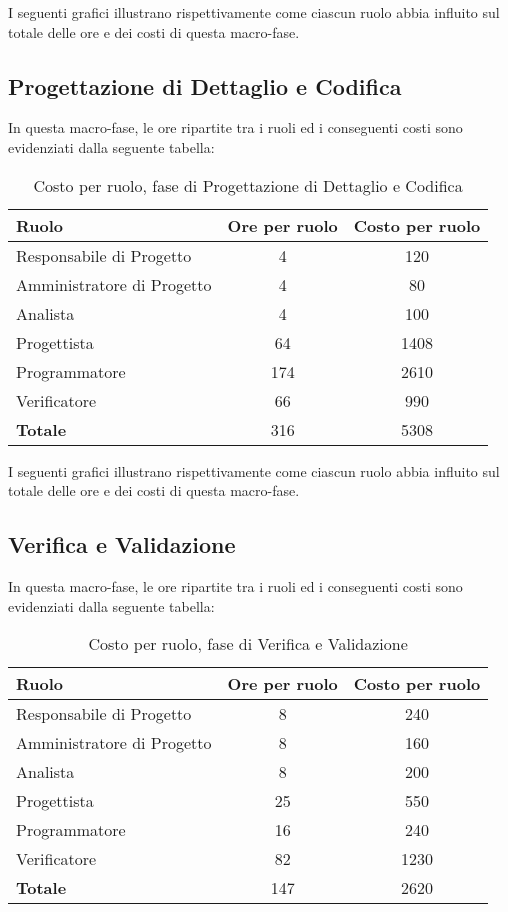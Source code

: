 I seguenti grafici illustrano rispettivamente come ciascun ruolo abbia influito sul totale delle ore e dei costi di questa macro-fase.

\subsection{Progettazione di Dettaglio e Codifica}
In questa macro-fase, le ore ripartite tra i ruoli ed i conseguenti costi sono evidenziati dalla seguente tabella:

\begin{table}[h]
	\centering
	\begin{tabular}{|l|c|c|}
		\toprule
		\textbf{Ruolo} & \textbf{Ore per ruolo} & \textbf{Costo per ruolo} \\
		
		\midrule
		Responsabile di Progetto & 4 & 120 \\
		Amministratore di Progetto & 4 & 80 \\ 
		Analista & 4 & 100 \\
		Progettista & 64 & 1408 \\
		Programmatore & 174 & 2610 \\
		Verificatore & 66 & 990 \\
		\midrule
		\textbf{Totale} & 316 & 5308 \\
		
		\bottomrule
	\end{tabular}
	\caption{Costo per ruolo, fase di Progettazione di Dettaglio e Codifica}
\end{table}

I seguenti grafici illustrano rispettivamente come ciascun ruolo abbia influito sul totale delle ore e dei costi di questa macro-fase.

\subsection{Verifica e Validazione}
In questa macro-fase, le ore ripartite tra i ruoli ed i conseguenti costi sono evidenziati dalla seguente tabella:

\begin{table}[h]
	\centering
	\begin{tabular}{|l|c|c|}
		\toprule
		\textbf{Ruolo} & \textbf{Ore per ruolo} & \textbf{Costo per ruolo} \\
		
		\midrule
		Responsabile di Progetto & 8 & 240 \\
		Amministratore di Progetto & 8 & 160 \\ 
		Analista & 8 & 200 \\
		Progettista & 25 & 550 \\
		Programmatore & 16 & 240 \\
		Verificatore & 82 & 1230 \\
		\midrule
		\textbf{Totale} & 147 & 2620 \\
		
		\bottomrule
	\end{tabular}
	\caption{Costo per ruolo, fase di Verifica e Validazione}
\end{table}

